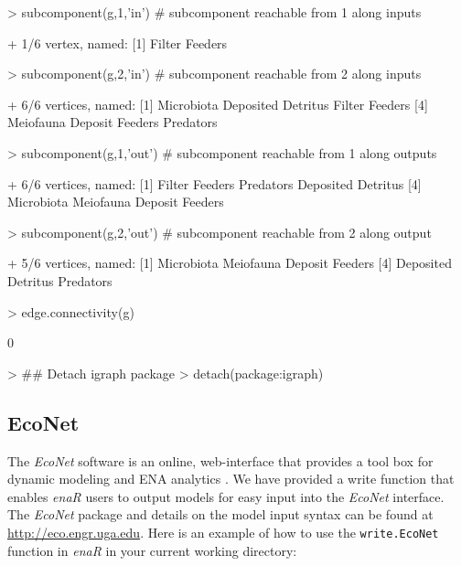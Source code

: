 \documentclass[article]{jss}
\begin{document}
\begin{Schunk}
\begin{Sinput}
> subcomponent(g,1,'in')  # subcomponent reachable from 1 along inputs
\end{Sinput}
\begin{Soutput}
+ 1/6 vertex, named:
[1] Filter Feeders
\end{Soutput}
\begin{Sinput}
> subcomponent(g,2,'in')  # subcomponent reachable from 2 along inputs
\end{Sinput}
\begin{Soutput}
+ 6/6 vertices, named:
[1] Microbiota         Deposited Detritus Filter Feeders    
[4] Meiofauna          Deposit Feeders    Predators         
\end{Soutput}
\begin{Sinput}
> subcomponent(g,1,'out') # subcomponent reachable from 1 along outputs
\end{Sinput}
\begin{Soutput}
+ 6/6 vertices, named:
[1] Filter Feeders     Predators          Deposited Detritus
[4] Microbiota         Meiofauna          Deposit Feeders   
\end{Soutput}
\begin{Sinput}
> subcomponent(g,2,'out') # subcomponent reachable from 2 along output
\end{Sinput}
\begin{Soutput}
+ 5/6 vertices, named:
[1] Microbiota         Meiofauna          Deposit Feeders   
[4] Deposited Detritus Predators         
\end{Soutput}
\begin{Sinput}
> edge.connectivity(g)
\end{Sinput}
\begin{Soutput}
[1] 0
\end{Soutput}
\begin{Sinput}
> ## Detach igraph package
> detach(package:igraph)
\end{Sinput}
\end{Schunk}

\subsection{EcoNet}

The \textit{EcoNet} software is an online, web-interface that provides
a tool box for dynamic modeling and ENA analytics \citep{kazanci07}. We
have provided a write function that enables \textit{enaR} users to
output models for easy input into the \textit{EcoNet} interface. The
\textit{EcoNet} package and details on the model input syntax can be
found at \url{http://eco.engr.uga.edu}. Here is an example of how to
use the \texttt{write.EcoNet} function in \textit{enaR} in your
current working directory:
\end{document}
